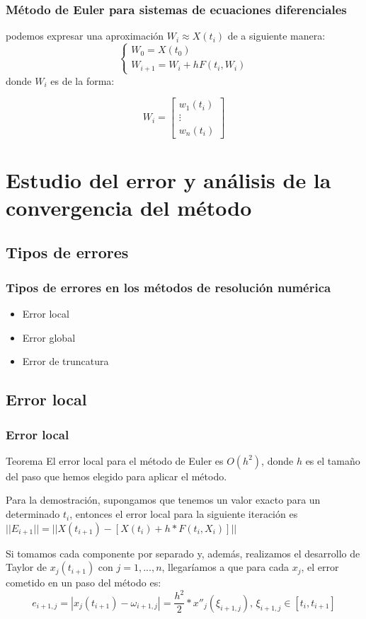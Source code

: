 \documentclass{beamer}
\begin{document}
\begin{frame}
	\frametitle{Método de Euler para sistemas de ecuaciones diferenciales}
	
	podemos expresar una aproximación $W_i \approx X(t_i)$ de a siguiente manera:
	$$
	\begin{cases}
	W_0=X(t_0)\\
	W_{i+1}=W_i + hF(t_i,W_i)
	\end{cases}
	$$
	donde $W_i$ es de la forma:
	
	\begin{equation*}
	W_i=\begin{bmatrix}
	w_1(t_i) \\
	\vdots \\
	w_n(t_i)
	\end{bmatrix}
	\end{equation*}
	
	
\end{frame}

\section{Estudio del error y análisis de la convergencia del método}

\subsection{Tipos de errores}
\begin{frame}
	\frametitle{Tipos de errores en los métodos de resolución numérica}

	\begin{itemize}
	\item Error local
	\item Error global
	\item Error de truncatura
	\end{itemize}

\end{frame}

\subsection{Error local}
\begin{frame}
	\frametitle{Error local}
	\begin{block}{Teorema}
	El error local para el método de Euler es $O(h^2)$, donde $h$ es el tamaño del paso que hemos elegido para aplicar el método.
	\end{block}
	
	Para la demostración, supongamos que tenemos un valor exacto para un determinado $t_i$, entonces el error local para la siguiente iteración es $|| E_{i+1} || = ||X(t_{i+1}) - [X(t_{i}) + h*F(t_i, X_i)] ||$
	
	Si tomamos cada componente por separado y, además, realizamos el desarrollo de Taylor de $x_j(t_{i+1})$ con $j=1,...,n$, llegaríamos a que para cada $x_j$, el error cometido en un paso del método es:
	$$ e_{i+1, j} = | x_j(t_{i+1}) - \omega_{i+1, j} | = \frac{h^2}{2}*x''_j(\xi_{i+1, j}),\, \xi_{i+1, j} \in [t_i, t_{i+1}] $$	
	
\end{frame}
\end{document}
